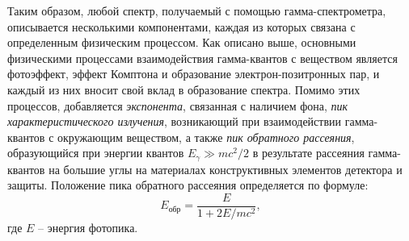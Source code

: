 \documentclass[a4paper]{article}
\begin{document}
Таким образом, любой спектр, получаемый с помощью гамма-спектрометра, описывается несколькими компонентами, каждая из которых связана с определенным физическим процессом. Как описано выше, основными физическими процессами взаимодействия гамма-квантов с веществом является фотоэффект, эффект Комптона и образование электрон-позитронных пар, и каждый из них вносит свой вклад в образование спектра. Помимо этих процессов, добавляется \textit{экспонента}, связанная с наличием фона, \textit{пик характеристического излучения}, возникающий при взаимодействии гамма-квантов с окружающим веществом, а также \textit{пик обратного рассеяния}, образующийся при энергии квантов $E_{\gamma}\gg mc^2/2$ в результате рассеяния гамма-квантов на большие углы на материалах  конструктивных элементов детектора и защиты. Положение пика обратного рассеяния определяется по формуле:
\begin{equation}
E_{\text{обр}}=\frac{E}{1+2E/mc^2},
\label{eq:Ereverse}
\end{equation}
где $E$ -- энергия фотопика.\par
\end{document}
